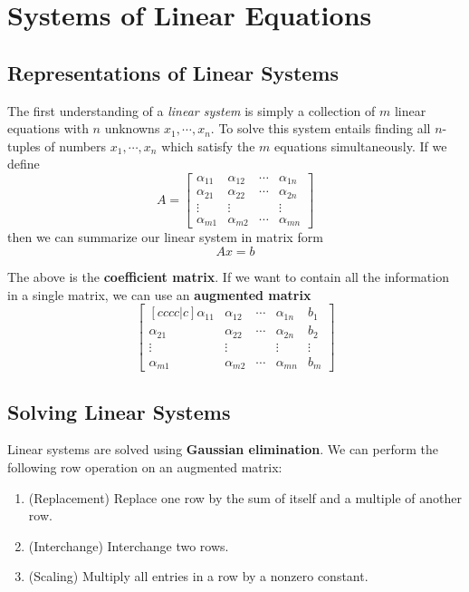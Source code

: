 \chapter{Systems of Linear Equations}
\section{Representations of Linear Systems}
The first understanding of a \textit{linear system} is simply a collection of $m$ linear equations with $n$ unknowns $x_{1}, \cdots, x_{n}$. To solve this system entails finding all $n$-tuples of numbers $x_{1}, \cdots, x_{n}$ which satisfy the $m$ equations simultaneously. If we define 
$$A = \begin{bmatrix}
\alpha_{11} & \alpha_{12} & \cdots & \alpha_{1n} \\
\alpha_{21} & \alpha_{22} & \cdots & \alpha_{2n} \\
\vdots & \vdots & & \vdots \\
\alpha_{m1} & \alpha_{m2} & \cdots & \alpha_{mn}
\end{bmatrix}$$
then we can summarize our linear system in matrix form
$$Ax = b$$

The above is the \textbf{coefficient matrix}. If we want to contain all the information in a single matrix, we can use an \textbf{augmented matrix} 
$$\begin{bmatrix}[cccc|c]
\alpha_{11} & \alpha_{12} & \cdots & \alpha_{1n} & b_{1}\\
\alpha_{21} & \alpha_{22} & \cdots & \alpha_{2n} & b_{2}\\
\vdots & \vdots & & \vdots & \vdots\\
\alpha_{m1} & \alpha_{m2} & \cdots & \alpha_{mn} & b_{m}
\end{bmatrix}$$

\section{Solving Linear Systems}
Linear systems are solved using \textbf{Gaussian elimination}. We can perform the following row operation on an augmented matrix:
\begin{enumerate}
	\item (Replacement) Replace one row by the sum of itself and a multiple of another row. 
	\item (Interchange) Interchange two rows. 
	\item (Scaling) Multiply all entries in a row by a nonzero constant. 
\end{enumerate}

